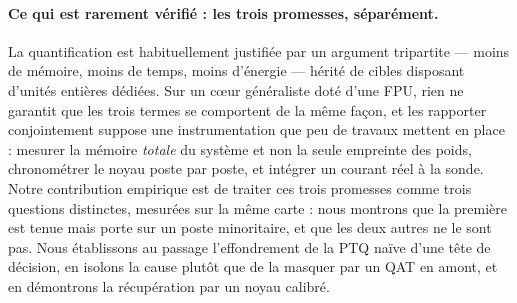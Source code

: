 \paragraph{Ce qui est rarement vérifié : les trois promesses, séparément.} La quantification est
habituellement justifiée par un argument tripartite --- moins de mémoire, moins de temps, moins d'énergie
--- hérité de cibles disposant d'unités entières dédiées. Sur un cœur généraliste doté d'une \gls{FPU}, rien ne
garantit que les trois termes se comportent de la même façon, et les rapporter conjointement suppose une
instrumentation que peu de travaux mettent en place : mesurer la mémoire \emph{totale} du système et non
la seule empreinte des poids, chronométrer le noyau poste par poste, et intégrer un courant réel à la
sonde. Notre contribution empirique est de traiter ces trois promesses comme trois questions distinctes,
mesurées sur la même carte : nous montrons que la première est tenue mais porte sur un poste minoritaire,
et que les deux autres ne le sont pas. Nous établissons au passage l'effondrement de la PTQ naïve d'une
tête de décision, en isolons la cause plutôt que de la masquer par un QAT en amont, et en démontrons la
récupération par un noyau calibré.

